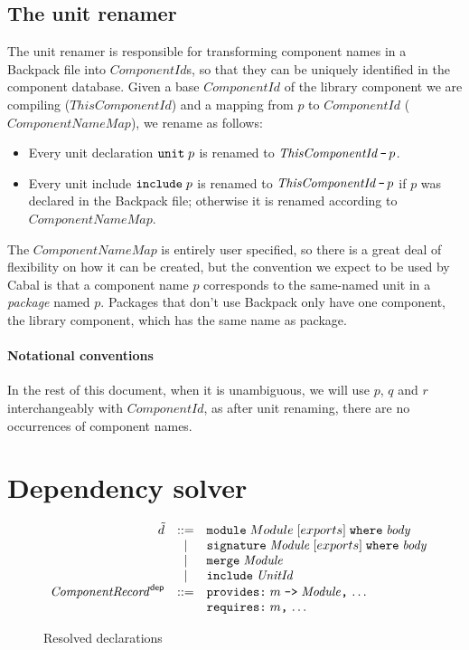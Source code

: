 \documentclass{article}
\newcommand{\I}[1]{\ensuremath{\mathit{#1}}}
\begin{document}
\subsection{The unit renamer}

The unit renamer is responsible for transforming component names in a
Backpack file into \I{ComponentId}s, so that they can be uniquely
identified in the component database.
Given a base \I{ComponentId} of the library component we are compiling (\I{ThisComponentId})
and a mapping from $p$ to \I{ComponentId} (\I{ComponentNameMap}), we rename
as follows:

\begin{itemize}
    \item Every unit declaration $\verb|unit|\; p$ is renamed to $\I{ThisComponentId}\, \verb|-|\, p$.
    \item Every unit include $\verb|include|\; p$ is renamed to $\I{ThisComponentId}\, \verb|-|\, p$ if $p$ was declared in the Backpack file; otherwise it is renamed according to \I{ComponentNameMap}.
\end{itemize}

The \I{ComponentNameMap} is entirely user specified, so there is a great deal
of flexibility on how it can be created, but the convention we expect to
be used by Cabal is that a component name $p$ corresponds to the same-named
unit in a \emph{package} named $p$.  Packages that don't use Backpack
only have one component, the library component, which has the same name as package.

\paragraph{Notational conventions}
In the rest of this document, when it is unambiguous, we will use $p$, $q$ and $r$
interchangeably with \I{ComponentId}, as after unit renaming, there
are no occurrences of component names.

\newpage
\section{Dependency solver}

\begin{figure}[htpb]
$$
\begin{array}{rcll}
  \tilde{d} & ::= & \verb|module|\;    Module \; [exports]\; \verb|where|\; \I{body} \\
    & |   & \verb|signature|\; \I{Module} \; [exports]\; \verb|where|\; \I{body} \\
    & |   & \verb|merge|\; \I{Module} \\
    & |   & \verb|include|\; \I{UnitId} \\
  \I{ComponentRecord}^{\mathsf{dep}} & ::= & \verb|provides:|\; m\; \verb|->|\; \I{Module}\verb|,|\, \ldots\\
    & & \verb|requires:|\; m\verb|,|\, \ldots
\end{array}
$$
\caption{Resolved declarations} \label{fig:resolved}
\end{figure}
\end{document}

